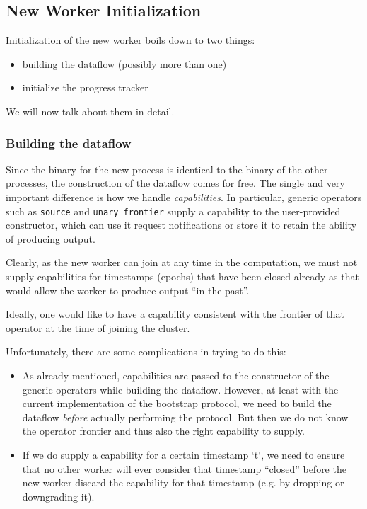 \documentclass[12pt]{extarticle}
\begin{document}
\subsection{New Worker Initialization}

Initialization of the new worker boils down to two things:
\begin{itemize}
    \item building the dataflow (possibly more than one)
    \item initialize the progress tracker
\end{itemize}

We will now talk about them in detail.

\subsubsection{Building the dataflow}
Since the binary for the new process is identical to the binary of the other processes,
the construction of the dataflow comes for free.
The single and very important difference is how we handle \textit{capabilities}.
In particular, generic operators such as \verb|source| and \verb|unary_frontier| supply
a capability to the user-provided constructor, which can use it request notifications
or store it to retain the ability of producing output.

Clearly, as the new worker can join at any time in the computation, we must not supply
capabilities for timestamps (epochs) that have been closed already as that would allow
the worker to produce output ``in the past''.

Ideally, one would like to have a capability consistent with the frontier
of that operator at the time of joining the cluster.


Unfortunately, there are some complications in trying to do this:
\begin{itemize}
    \item As already mentioned, capabilities are passed to the constructor
        of the generic operators while building the dataflow. However, at least
        with the current implementation of the bootstrap protocol, we need to build
        the dataflow \textit{before} actually performing the protocol. But then
        we do not know the operator frontier and thus also the right capability to supply.

    \item If we do supply a capability for a certain timestamp `t`, we need to ensure
        that no other worker will ever consider that timestamp ``closed'' before the new
        worker discard the capability for that timestamp (e.g. by dropping or downgrading it).

\end{itemize}
\end{document}
